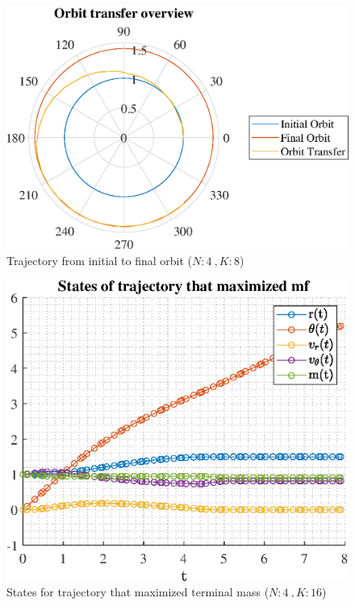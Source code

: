 \documentclass[]{article}
\begin{document}
	\begin{figure}
		\centering
		\includegraphics[scale=0.75]{orbit_N4_K8_C2_mf.eps}
		\caption{Trajectory from initial to final orbit (\(N:4\ , K:8\))}
		\label{fig:orbit_N4_K8_C2_mf}
	\end{figure}
	\begin{figure}
		\centering
		\includegraphics[scale=0.75]{states_N4_K16_C2_mf.eps}
		\caption{States for trajectory that maximized terminal mass (\(N:4\ , K:16\))}
		\label{fig:states_N4_K16_C2_mf}
	\end{figure}
\end{document}

